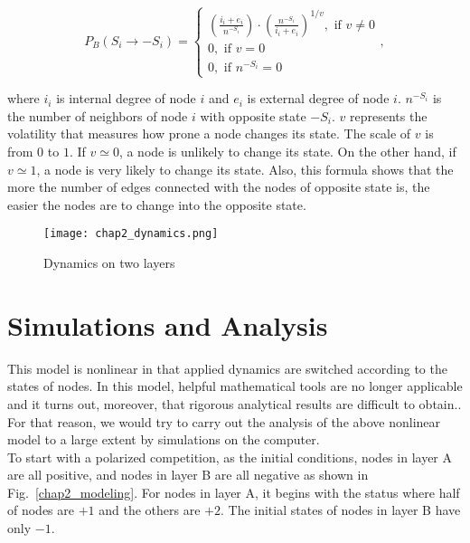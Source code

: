 \begin{equation}
{P_B}({S_i} \to  - {S_i}) = \begin{cases}
{\left({\displaystyle\frac{{{i_i} + {e_i}}}{{{n^{ - {S_i}}}}}}\right)}{\cdot}{\left({\displaystyle\frac{{n^{-{S_i}}}}{{{i_i} + {e_i}}}} \right)^{1/v}}  ,\mbox{ if } v \ne 0\\
0,\mbox{ if } v = 0\\
0,\mbox{ if } {n^{ - {S_i}}} = 0
\end{cases},
\end{equation}

where $i_i$ is internal degree of node $i$ and $e_i$ is external degree of node $i$. $n^{-S_i}$ is the number of neighbors of node $i$ with opposite state $-S_i$. $v$ represents the volatility that measures how prone a node changes its state. The scale of $v$ is from $0$ to $1$. If $v \simeq 0$,  a node is unlikely to change its state. On the other hand, if $v \simeq 1$, a node is very likely to change its state. Also, this formula shows that the more the number of edges connected with the nodes of opposite state is, the easier the nodes are to change into the opposite state.\\
\begin{figure}[!htb]
	\centering
	\texttt{[image: chap2\_dynamics.png]}
	\caption{Dynamics on two layers}
	\label{chap2_dynamics}
\end{figure}


\section{Simulations and Analysis}
This model is nonlinear in that applied dynamics are switched according to the states of nodes. In this model, helpful mathematical tools are no longer applicable and  it turns out, moreover, that rigorous analytical results are difficult to obtain.\parencite{nicolas2017, rainer2002}. For that reason, we would try to carry out the analysis of the above nonlinear model to a large extent by simulations on the computer.\\

To start with a polarized competition, as the initial conditions,  nodes in layer A are all positive, and nodes in layer B are all negative as shown in Fig.~\ref{chap2_modeling}. For nodes in layer A, it begins with the status where half of nodes are $+1$ and the others are $+2$. The initial states of nodes in layer B have only $-1$. \\

